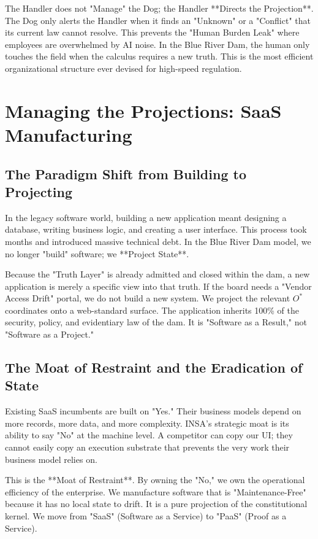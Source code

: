 \documentclass[12pt,a4paper,oneside]{book}
\begin{document}
The Handler does not "Manage" the Dog; the Handler **Directs the Projection**. The Dog only alerts the Handler when it finds an "Unknown" or a "Conflict" that its current law cannot resolve. This prevents the "Human Burden Leak" where employees are overwhelmed by AI noise. In the Blue River Dam, the human only touches the field when the calculus requires a new truth. This is the most efficient organizational structure ever devised for high-speed regulation.

\chapter{Managing the Projections: SaaS Manufacturing}

\section{The Paradigm Shift from Building to Projecting}
In the legacy software world, building a new application meant designing a database, writing business logic, and creating a user interface. This process took months and introduced massive technical debt. In the Blue River Dam model, we no longer "build" software; we **Project State**.

Because the "Truth Layer" is already admitted and closed within the dam, a new application is merely a specific view into that truth. If the board needs a "Vendor Access Drift" portal, we do not build a new system. We project the relevant $O^*$ coordinates onto a web-standard surface. The application inherits 100\% of the security, policy, and evidentiary law of the dam. It is "Software as a Result," not "Software as a Project."

\section{The Moat of Restraint and the Eradication of State}
Existing SaaS incumbents are built on "Yes." Their business models depend on more records, more data, and more complexity. INSA's strategic moat is its ability to say "No" at the machine level. A competitor can copy our UI; they cannot easily copy an execution substrate that prevents the very work their business model relies on. 

This is the **Moat of Restraint**. By owning the "No," we own the operational efficiency of the enterprise. We manufacture software that is "Maintenance-Free" because it has no local state to drift. It is a pure projection of the constitutional kernel. We move from "SaaS" (Software as a Service) to "PaaS" (Proof as a Service).
\end{document}
